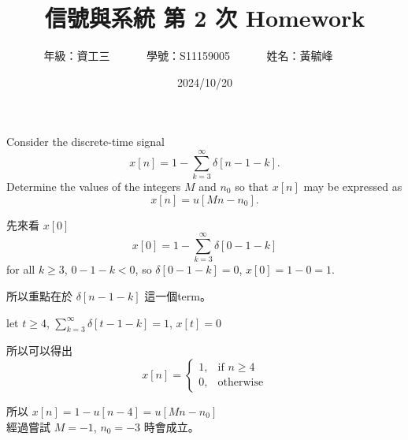 \documentclass[12pt,a4paper]{article}
\begin{document}
\title{
  {
    \heiti 信號與系統 第 2 次 Homework
  }
}


\date{2024/10/20}
\author{
  年級：{資工三}~~~~~~
  學號：{S11159005}~~~~~~
  姓名：{黃毓峰}~~~~~~
}

\maketitle
\newlength{\question}
\settowidth{\question}{XX}

\section*{\heiti \color{black}{Question - 1.12}}

\parbox[t]{\dimexpr\linewidth-\question}{
  Consider the discrete-time signal
  \[
    x[n] = 1 - \sum_{k=3}^{\infty} \delta[n - 1 - k].
  \]
      Determine the values of the integers \(M\) and \(n_0\) so that \(x[n]\) may be expressed as
  \[
  x[n] = u[Mn - n_0].
  \]
  
}


\parbox[t]{\dimexpr\linewidth-\question} {
  先來看 \(x[0]\)
  \[
    x[0] = 1 - \sum_{k=3}^{\infty} \delta[0 - 1 - k]
  \]
  for all \(k \geq 3\), \(0 - 1 - k < 0\), so \(\delta[0 - 1 - k] = 0\),
  \(
    x[0] = 1 - 0 = 1.
  \)

  所以重點在於 \(\delta[n - 1 - k]\) 這一個term。

  let \(t \geq 4\),  \(\sum_{k=3}^{\infty} \delta[t - 1 - k] = 1\),  \(x[t] = 0\)

  所以可以得出
  \[
    x[n] = 
      \begin{cases}
          1,              & \text{if } n\geq 4\\
          0,              & \text{otherwise}
      \end{cases}
  \]

  所以 \(x[n]=1- u[n-4]=u[Mn-n_0]\)\\
  經過嘗試\footnotemark{} \(M = -1\), \(n_0 = -3\) 時會成立。
}

\newpage

\section*{\heiti \color{black}{Question - 1.15}}
\end{document}
